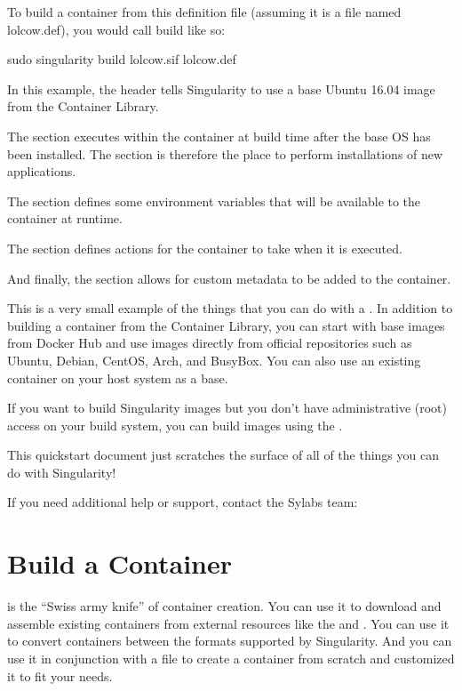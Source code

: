 \documentclass[letterpaper,10pt,english]{sphinxmanual}
\begin{document}
To build a container from this definition file (assuming it is a file
named lolcow.def), you would call build like so:

%
\begin{sphinxVerbatim}[commandchars=\\\{\}]
\PYGZdl{} sudo singularity build lolcow.sif lolcow.def
\end{sphinxVerbatim}

In this example, the header tells Singularity to use a base Ubuntu 16.04 image
from the Container Library.

The  section executes within the container at build time after the base
OS has been installed. The  section is therefore the place to perform
installations of new applications.

The  section defines some environment variables that will be
available to the container at runtime.

The  section defines actions for the container to take when it is
executed.

And finally, the  section allows for custom metadata to be added to
the container.

This is a very small example of the things that you can do with a .
In addition to building a container from the Container Library, you can start
with base images from Docker Hub and use images directly from official
repositories such as Ubuntu, Debian, CentOS, Arch, and BusyBox.  You can also
use an existing container on your host system as a base.

If you want to build Singularity images but you don’t have administrative (root)
access on your build system, you can build images using the .

This quickstart document just scratches the surface of all of the things you can
do with Singularity!

If you need additional help or support, contact the Sylabs team:


\chapter{Build a Container}
\label{\detokenize{build_a_container:build-a-container}}\label{\detokenize{build_a_container:id1}}\label{\detokenize{build_a_container::doc}}\label{\detokenize{build_a_container:sec-build-a-container}}
 is the “Swiss army knife” of container creation. You can use it to
download and assemble existing containers from external resources like the
 and
. You can use it to convert containers
between the formats supported by Singularity. And you can use it in conjunction
with a  file to create a
container from scratch and customized it to fit your needs.
\end{document}
